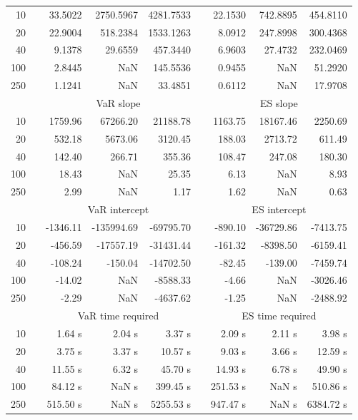 {\begin{table}[h]
\begin{tabular}{rr rrr r rrr}
10 &&  33.5022 & 2750.5967 & 4281.7533 & & 22.1530 & 742.8895 & 454.8110 \\ 
20 &&  22.9004 & 518.2384 & 1533.1263 & & 8.0912 & 247.8998 & 300.4368 \\ 
40 &&  9.1378 & 29.6559 & 457.3440 & & 6.9603 & 27.4732 & 232.0469 \\ 
100 &&  2.8445 &    NaN & 145.5536 & & 0.9455 &    NaN & 51.2920 \\ 
250 &&  1.1241 &    NaN & 33.4851 & & 0.6112 &    NaN & 17.9708 \\ 
\hline 
 & & \multicolumn{3}{c}{ VaR slope} && \multicolumn{3}{c}{ES slope} \\ \cline{3-5}  \cline{7-9}
10 && 1759.96 & 67266.20 & 21188.78 && 1163.75 & 18167.46 & 2250.69 \\ 
20 && 532.18 & 5673.06 & 3120.45 && 188.03 & 2713.72 & 611.49 \\ 
40 && 142.40 & 266.71 & 355.36 && 108.47 & 247.08 & 180.30 \\ 
100 && 18.43 &  NaN & 25.35 && 6.13 &  NaN & 8.93 \\ 
250 && 2.99 &  NaN & 1.17 && 1.62 &  NaN & 0.63 \\ 
\hline 
 & & \multicolumn{3}{c}{ VaR intercept} &&  \multicolumn{3}{c}{ES intercept} \\ \cline{3-5}  \cline{7-9}
10 &&  -1346.11 & -135994.69 & -69795.70 && -890.10 & -36729.86 & -7413.75 \\ 
20 &&  -456.59 & -17557.19 & -31431.44 && -161.32 & -8398.50 & -6159.41 \\ 
40 &&  -108.24 & -150.04 & -14702.50 && -82.45 & -139.00 & -7459.74 \\ 
100 &&  -14.02 &  NaN & -8588.33 && -4.66 &  NaN & -3026.46 \\ 
250 &&  -2.29 &  NaN & -4637.62 && -1.25 &  NaN & -2488.92 \\ 
\hline 
 & & \multicolumn{3}{c}{VaR time required} && \multicolumn{3}{c}{ES time required} \\ \cline{3-5}  \cline{7-9}
10 & & 1.64 s & 2.04 s & 3.37 s && 2.09 s & 2.11 s & 3.98 s \\ 
20 & & 3.75 s & 3.37 s & 10.57 s && 9.03 s & 3.66 s & 12.59 s \\ 
40 & & 11.55 s & 6.32 s & 45.70 s && 14.93 s & 6.78 s & 49.90 s \\ 
100 & & 84.12 s &  NaN s & 399.45 s && 251.53 s &  NaN s & 510.86 s \\ 
250 & & 515.50 s &  NaN s & 5255.53 s && 947.47 s &  NaN s & 6384.72 s \\ 

\end{tabular}
\end{table}}
